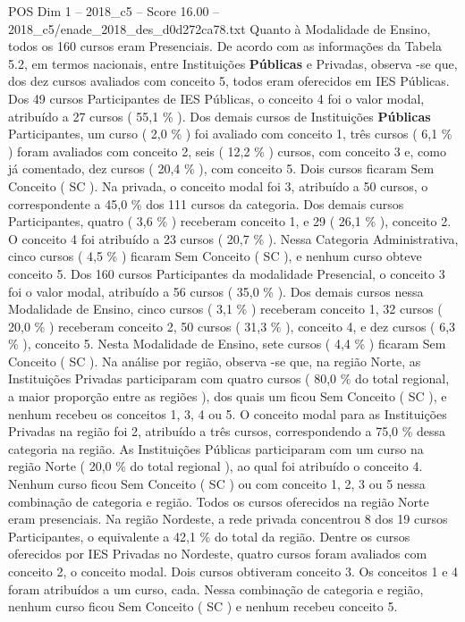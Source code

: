\begin{textsample}{POS Dim 1 – 2018\_c5 – Score 16.00 – 2018\_c5/enade\_2018\_des\_d0d272ca78.txt}
Quanto à Modalidade de Ensino, todos os 160 cursos eram Presenciais.
De acordo com as informações da Tabela 5.2, em termos nacionais, entre Instituições \textbf{Públicas} e Privadas, observa -se que, dos dez cursos avaliados com conceito 5, todos eram oferecidos em IES Públicas.
Dos 49 cursos Participantes de IES Públicas, o conceito 4 foi o valor modal, atribuído a 27 cursos ( 55,1 \% ).
Dos demais cursos de Instituições \textbf{Públicas} Participantes, um curso ( 2,0 \% ) foi avaliado com conceito 1, três cursos ( 6,1 \% ) foram avaliados com conceito 2, seis ( 12,2 \% ) cursos, com conceito 3 e, como já comentado, dez cursos ( 20,4 \% ), com conceito 5.
Dois cursos ficaram Sem Conceito ( SC ).
Na privada, o conceito modal foi 3, atribuído a 50 cursos, o correspondente a 45,0 \% dos 111 cursos da categoria.
Dos demais cursos Participantes, quatro ( 3,6 \% ) receberam conceito 1, e 29 ( 26,1 \% ), conceito 2.
O conceito 4 foi atribuído a 23 cursos ( 20,7 \% ).
Nessa Categoria Administrativa, cinco cursos ( 4,5 \% ) ficaram Sem Conceito ( SC ), e nenhum curso obteve conceito 5.
Dos 160 cursos Participantes da modalidade Presencial, o conceito 3 foi o valor modal, atribuído a 56 cursos ( 35,0 \% ).
Dos demais cursos nessa Modalidade de Ensino, cinco cursos ( 3,1 \% ) receberam conceito 1, 32 cursos ( 20,0 \% ) receberam conceito 2, 50 cursos ( 31,3 \% ), conceito 4, e dez cursos ( 6,3 \% ), conceito 5.
Nesta Modalidade de Ensino, sete cursos ( 4,4 \% ) ficaram Sem Conceito ( SC ).
Na análise por região, observa -se que, na região Norte, as Instituições Privadas participaram com quatro cursos ( 80,0 \% do total regional, a maior proporção entre as regiões ), dos quais um ficou Sem Conceito ( SC ), e nenhum recebeu os conceitos 1, 3, 4 ou 5.
O conceito modal para as Instituições Privadas na região foi 2, atribuído a três cursos, correspondendo a 75,0 \% dessa categoria na região.
As Instituições Públicas participaram com um curso na região Norte ( 20,0 \% do total regional ), ao qual foi atribuído o conceito 4.
Nenhum curso ficou Sem Conceito ( SC ) ou com conceito 1, 2, 3 ou 5 nessa combinação de categoria e região.
Todos os cursos oferecidos na região Norte eram presenciais.
Na região Nordeste, a rede privada concentrou 8 dos 19 cursos Participantes, o equivalente a 42,1 \% do total da região.
Dentre os cursos oferecidos por IES Privadas no Nordeste, quatro cursos foram avaliados com conceito 2, o conceito modal.
Dois cursos obtiveram conceito 3.
Os conceitos 1 e 4 foram atribuídos a um curso, cada.
Nessa combinação de categoria e região, nenhum curso ficou Sem Conceito ( SC ) e nenhum recebeu conceito 5.

\end{textsample}
